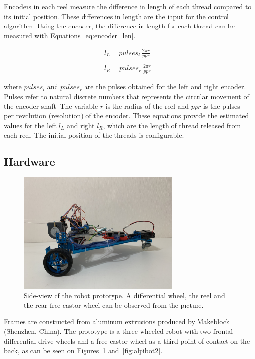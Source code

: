 \documentclass[journal]{IEEEtran}
\begin{document}
Encoders in each reel measure the difference in length of each thread compared to its initial position. These differences in length are the input for the control algorithm.  Using the encoder, the difference in length for each thread can be measured with Equations~\ref{eq:encoder_len}.

\begin{equation}
\label{eq:encoder_len}
\begin{array}{ll}  
l_L = pulses_{l} \; \frac{2\pi r}{ppr}  \\
\\
l_R = pulses_{r} \; \frac{2\pi r}{ppr}
\end{array}
\end{equation}{}

\noindent where $pulses_{l}$ and $pulses_{r}$ are the pulses obtained for the left and right encoder.  Pulses refer to natural discrete numbers that represents the circular movement of the encoder shaft.  The variable $r$ is the radius of the reel and $ppr$ is the pulses per revolution (resolution) of the encoder. These equations provide the estimated values for the left $l_L$ and right $l_R$, which are the length of thread released from each reel.   The initial position of the threads is configurable.

\subsection{Hardware}

\begin{figure}[h!]
\centering
\includegraphics[width=8cm]{images/alpibot1.jpg}
\caption{Side-view of the robot prototype.  A differential wheel, the reel and the rear free castor wheel can be observed from the picture.}
\label{fig:alpibot1}
\end{figure}


Frames are constructed from aluminum extrusions produced by Makeblock (Shenzhen, China).   The prototype is a three-wheeled robot with two frontal differential drive wheels and a free castor wheel as a third point of contact on the back, as can be seen on Figures~\ref{fig:alpibot1} and~\ref{fig:alpibot2}.  
\end{document}

